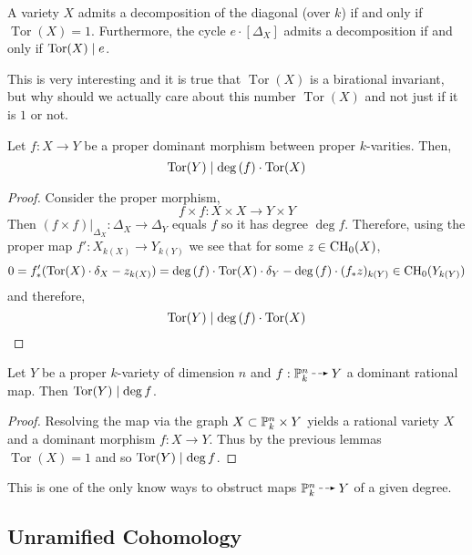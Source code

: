\documentclass[12pt]{article}
\DeclareMathOperator{\torsion}{\mathrm{Tor}}
\begin{document}
\begin{lemma}
A variety $X$ admits a decomposition of the diagonal (over $k$) if and only if $\torsion(X) = 1$. Furthermore, the cycle $e \cdot [\Delta_X]$ admits a decomposition if and only if $\torsion(X) \divides e$.
\end{lemma}


This is very interesting and it is true that $\torsion(X)$ is a birational invariant, but why should we actually care about this number $\torsion(X)$ and not just if it is $1$ or not.

\begin{lemma}
Let $f : X \to Y$ be a proper dominant morphism between proper $k$-varities. Then,
\[ \torsion(Y) \divides \deg{(f)} \cdot \torsion(X) \] 
\end{lemma}

\begin{proof}
Consider the proper morphism,
\[ f \times f : X \times X \to Y \times Y \]
Then $(f \times f)|_{\Delta_X} : \Delta_X \to \Delta_Y$ equals $f$ so it has degree $\deg{f}$. Therefore, using the proper map $f' : X_{k(X)} \to Y_{k(Y)}$ we see that for some $z \in \CH_0(X)$,
\[ 0 = f'_* (\torsion(X) \cdot \delta_X - z_{k(X)}) = \deg{(f)} \cdot \torsion(X) \cdot \delta_Y - \deg{(f)} \cdot (f_* z)_{k(Y)} \in \CH_0(Y_{k(Y)}) \]
and therefore,
\[ \torsion(Y) \divides \deg{(f)} \cdot \torsion(X) \] 
\end{proof}

\begin{cor}
Let $Y$ be a proper $k$-variety of dimension $n$ and $f : \P^n_k \rat Y$ a dominant rational map. Then $\torsion(Y) \divides \deg{f}$.
\end{cor}

\begin{proof}
Resolving the map via the graph $X \subset \P^n_k \times Y$ yields a rational variety $X$ and a dominant morphism $f : X \to Y$. Thus by the previous lemmas $\torsion(X) = 1$ and so $\torsion(Y) \divides \deg{f}$.
\end{proof}

\begin{rmk}
This is one of the only know ways to obstruct maps $\P^n_k \rat Y$ of a given degree. 
\end{rmk}

\subsection{Unramified Cohomology}
\end{document}
